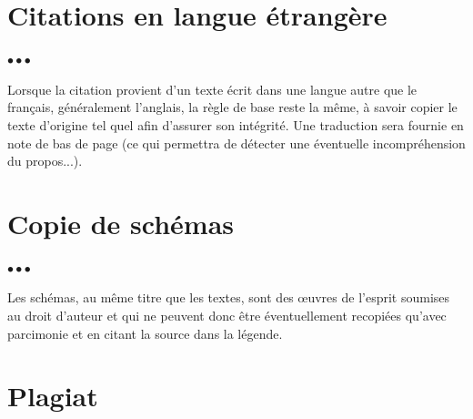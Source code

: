 \documentclass[11pt, french, screen, research-development]{report-rd-info}
\newenvironment{explanation}
{\color{blue}
 \begin{list}{}{\hspace{0.2\textwidth}\color{blue}}\item $\bullet\bullet\bullet$
}
{\end{list}}
\begin{document}
\section{Citations en langue étrangère}

\begin{explanation}
   Lorsque la citation provient d'un texte écrit dans une langue autre que le français, généralement l'anglais, la règle de base reste la même, à savoir copier le texte d'origine tel quel afin d'assurer son intégrité.
   Une traduction sera fournie en note de bas de page (ce qui permettra de détecter une éventuelle incompréhension du propos...).
\end{explanation}

\section{Copie de schémas}

\begin{explanation}
   Les schémas, au même titre que les textes, sont des \oe uvres de l'esprit soumises au droit d'auteur et qui ne peuvent donc être éventuellement recopiées qu'avec parcimonie et en citant la source dans la légende.
\end{explanation}

\section{Plagiat}
\label{ann:Plagiat}
\end{document}
